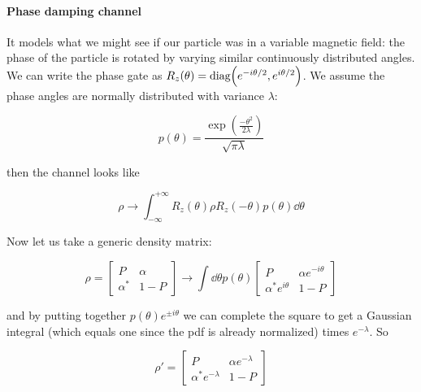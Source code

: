 \documentclass[main.tex]{subfiles}
\begin{document}
\paragraph{Phase damping channel}

It models what we might see if our particle was in a variable magnetic field: the phase of the particle is rotated by varying similar continuously distributed angles. We can write the phase gate as \(R_z(\theta) = \text{diag}\qty(e^{-i \theta/2}, e^{i \theta/2})\). We assume the phase angles are normally distributed with variance \(\lambda\):

\begin{equation}
    p (\theta) = \frac{\exp(\frac{-\theta^2}{2 \lambda}) }{\sqrt{\pi \lambda} }
\end{equation}

then the channel looks like

\begin{equation}
    \rho \rightarrow \int _{-\infty}   ^{+\infty} R_z(\theta) \rho R_z(-\theta) p(\theta)  \dd{\theta}
\end{equation}

Now let us take a generic density matrix:

\begin{equation}
    \rho = \begin{bmatrix}
    P   & \alpha \\
     \alpha^*  & 1-P
 \end{bmatrix}
\rightarrow
\int   \dd{\theta}p(\theta) \begin{bmatrix}
P   & \alpha e^{-i \theta} \\
 \alpha^* e^{i \theta}  & 1-P
\end{bmatrix}
\end{equation}

and by putting together \(p(\theta) e^{\pm i \theta}\) we can complete the square to get a Gaussian integral (which equals one since the pdf is already normalized) times \(e^{-\lambda}\). So

\begin{equation}
    \rho' = \begin{bmatrix}
    P   & \alpha e^{-\lambda} \\
     \alpha ^* e^{-\lambda}  & 1-P
 \end{bmatrix}
\end{equation}
\end{document}
